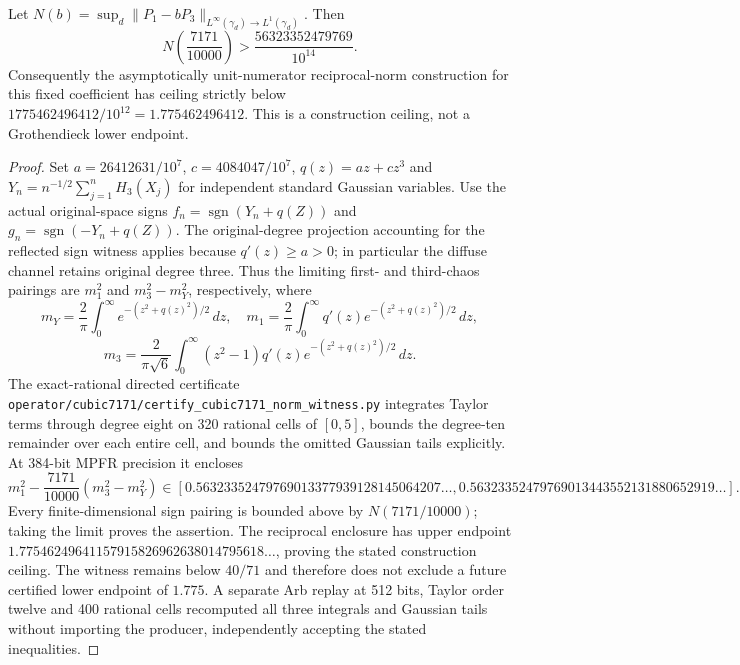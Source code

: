 \begin{proposition}[Exact reflected norm witness at $b=7171/10000$]
Let $N(b)=\sup_d\|P_1-bP_3\|_{L^\infty(\gamma_d)\to L^1(\gamma_d)}$.
Then
\[
 N\left(\frac{7171}{10000}\right)
 >\frac{56323352479769}{10^{14}}.
\]
Consequently the asymptotically unit-numerator reciprocal-norm construction
for this fixed coefficient has ceiling strictly below
$1775462496412/10^{12}=1.775462496412$.
This is a construction ceiling, not a Grothendieck lower endpoint.
\end{proposition}
\begin{proof}
Set $a=26412631/10^7$, $c=4084047/10^7$, $q(z)=az+cz^3$ and
$Y_n=n^{-1/2}\sum_{j=1}^nH_3(X_j)$ for independent standard Gaussian variables.
Use the actual original-space signs
$f_n=\operatorname{sgn}(Y_n+q(Z))$ and
$g_n=\operatorname{sgn}(-Y_n+q(Z))$.
The original-degree projection accounting for the reflected sign witness
applies because $q'(z)\ge a>0$; in particular the diffuse channel retains
original degree three.  Thus the limiting first- and third-chaos pairings are
$m_1^2$ and $m_3^2-m_Y^2$, respectively, where
\[
 m_Y=\frac2\pi\int_0^\infty e^{-(z^2+q(z)^2)/2}\,dz,
\quad
 m_1=\frac2\pi\int_0^\infty q'(z)e^{-(z^2+q(z)^2)/2}\,dz,
\]
\[
 m_3=\frac2{\pi\sqrt6}\int_0^\infty(z^2-1)q'(z)
                       e^{-(z^2+q(z)^2)/2}\,dz.
\]
The exact-rational directed certificate
\texttt{operator/cubic7171/certify\_cubic7171\_norm\_witness.py}
integrates Taylor terms through degree eight on 320 rational cells of $[0,5]$,
bounds the degree-ten remainder over each entire cell, and bounds the omitted
Gaussian tails explicitly.  At 384-bit MPFR precision it encloses
\[
 m_1^2-\frac{7171}{10000}(m_3^2-m_Y^2)
 \in[0.56323352479769013377939128145064207\ldots,
      0.56323352479769013443552131880652919\ldots].
\]
Every finite-dimensional sign pairing is bounded above by $N(7171/10000)$;
taking the limit proves the assertion.  The reciprocal enclosure has upper
endpoint $1.77546249641157915826962638014795618\ldots$, proving the stated
construction ceiling.  The witness remains below $40/71$ and therefore
does not exclude a future certified lower endpoint of $1.775$.
A separate Arb replay at 512 bits, Taylor order twelve and 400 rational cells
recomputed all three integrals and Gaussian tails without importing the
producer, independently accepting the stated inequalities.
\end{proof}
